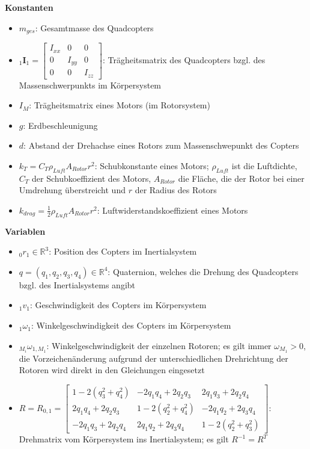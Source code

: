 \documentclass[12pt, a4paper]{scrartcl}
\newcommand{\R}{\mathbb{R}}
\begin{document}
\textbf{Konstanten}

\begin{itemize}
	\item $ m_{ges} $: Gesamtmasse des Quadcopters
	\item $ _{1}\mathbf{I}_{1} =
		\begin{bmatrix} I_{xx} & 0 & 0 \\
										0 & I_{yy} & 0 \\
										0 & 0 & I_{zz}
		\end{bmatrix} $: Trägheitsmatrix des Quadcopters bzgl. des Massenschwerpunkts im Körpersystem
		\item $ I_{M} $: Trägheitsmatrix eines Motors (im Rotorsystem)
		\item $ g $: Erdbeschleunigung
		\item $ d $: Abstand der Drehachse eines Rotors zum Massenschwepunkt des Copters
		\item $ k_T=C_T\rho_{Luft}A_{Rotor}r^2 $: Schubkonstante eines Motors; $ \rho_{Luft} $ ist die Luftdichte, $ C_T $ der Schubkoeffizient des Motors, $ A_{Rotor} $ die Fläche, die der Rotor bei einer Umdrehung überstreicht und $ r $ der Radius des Rotors
		\item $ k_{drag} = \frac{1}{2}\rho_{Luft}A_{Rotor}r^2 $: Luftwiderstandskoeffizient eines Motors
\end{itemize}

\textbf{Variablen}

\begin{itemize}
	\item \( _{0}r_{1} \in \R^3 \): Position des Copters im Inertialsystem
	\item \( q=( q_1, q_2, q_3, q_4) \in \R^4 \): Quaternion, welches die Drehung des Quadcopters bzgl. des Inertialsystems angibt
	\item \( _{1}v_{1} \): Geschwindigkeit des Copters im Körpersystem
	\item \( _{1}\omega_{1} \): Winkelgeschwindigkeit des Copters im Körpersystem
	\item \( _{M_i}\omega_{1,M_1} \): Winkelgeschwindigkeit der einzelnen Rotoren; es gilt immer \( \omega_{M_1} > 0 \), die Vorzeichenänderung aufgrund der unterschiedlichen Drehrichtung der Rotoren wird direkt in den Gleichungen eingesetzt
	\item $ R=R_{0,1}= \begin{bmatrix}
														 1-2(q_3^2 + q_4^2) & -2q_1q_4 +2q_2q_3 & 2q_1 q_3+2q_2q_4 \\

														 2q_1q_4+2q_2q_3 & 1-2(q_2^2 + q_4^2) & -2q_1q_2+2q_3q_4 \\

														 -2q_1q_3+2q_2q_4 & 2q_1q_2+2q_3q_4 & 1-2(q_2^2 + q_3^2)
											\end{bmatrix}
				$: Drehmatrix vom Körpersystem ins Inertialsystem; es gilt $ R^{-1} = R^T $
\end{itemize}
\end{document}
